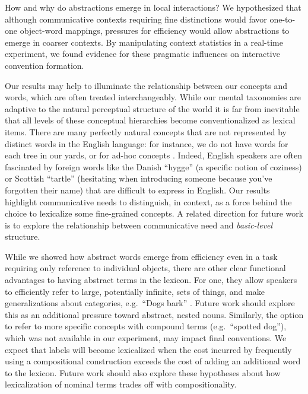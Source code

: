 How and why do abstractions emerge in local interactions? We hypothesized that although communicative contexts requiring fine distinctions would favor one-to-one object-word mappings, pressures for efficiency would allow abstractions to emerge in coarser contexts. By manipulating context statistics in a real-time experiment, we found evidence for these pragmatic influences on interactive convention formation.

Our results may help to illuminate the relationship between our concepts and words, which are often treated interchangeably. While our mental taxonomies are adaptive to the natural perceptual structure of the world \cite{MervisRosch81_CategorizationReview} %
it is far from inevitable that all levels of these conceptual hierarchies become conventionalized as lexical items. There are many perfectly natural concepts that are not represented by distinct words in the English language: for instance, we do not have words for each tree in our yards, or for ad-hoc concepts %
\cite{Barsalou83_AdHocCategories}. Indeed, English speakers are often fascinated by foreign words like the Danish ``hygge'' (a specific notion of coziness) or Scottish ``tartle'' (hesitating when introducing someone because you've forgotten their name) that are difficult to express in English.
Our results highlight communicative needs to distinguish, in context, as a force behind the choice to lexicalize some fine-grained concepts. 
A related direction for future work is to explore the relationship between communicative need and \emph{basic-level} structure.

While we showed how abstract words emerge from efficiency even in a task requiring only reference to individual objects, there are other clear functional advantages to having abstract terms in the lexicon. For one, they allow speakers to efficiently refer to large, potentially infinite, sets of things, and make generalizations about categories, e.g.\ ``Dogs bark'' \cite{TesslerGoodman16_Generics}. Future work should explore this as an additional pressure toward abstract, nested nouns.
Similarly, the option to refer to more specific concepts with compound terms (e.g.~``spotted dog''), which was not available in our experiment, may impact final conventions.
We expect that labels will become lexicalized when the cost incurred by frequently using a compositional construction exceeds the cost of adding an additional word to the lexicon. 
Future work should also explore these hypotheses about how lexicalization of nominal terms trades off with compositionality. 


